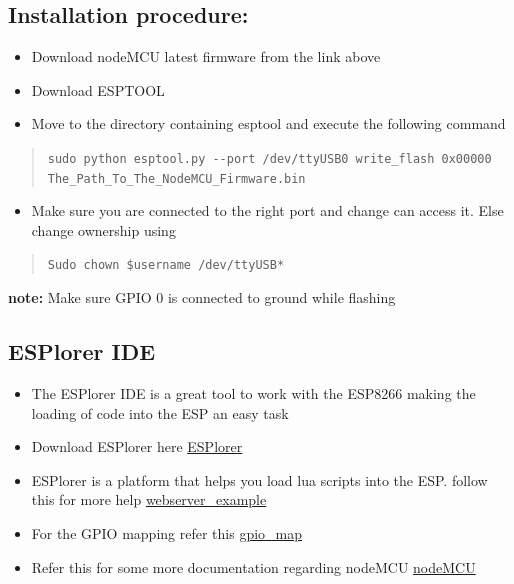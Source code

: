 \documentclass[16pt]{article}
\begin{document}
\subsection{Installation procedure:}

\begin{itemize}

\item
  Download nodeMCU latest firmware from the link above 
\item
  Download ESPTOOL
\item
  Move to the directory containing esptool and execute the following
  command
\end{itemize}

\begin{quote}
\texttt{sudo python esptool.py -{}-port /dev/ttyUSB0  write\_flash 0x00000 The\_Path\_To\_The\_NodeMCU\_Firmware.bin}
\end{quote}

\begin{itemize}

\item
  Make sure you are connected to the right port and change can access
  it. Else change ownership using
\end{itemize}

\begin{quote}
\texttt{Sudo chown \$username /dev/ttyUSB*}
\end{quote}

\textbf{note:} Make sure GPIO 0 is connected to ground while flashing
\vspace{0.5cm}

\subsection{ESPlorer IDE}

\begin{itemize}

\item
  The ESPlorer IDE is a great tool to work with the ESP8266 making the
  loading of code into the ESP an easy task
\item
  Download ESPlorer here
 {\color{red}\href{http://esp8266.ru/esplorer/\#download}{ESPlorer}}
\item
  ESPlorer is a platform that helps you load lua scripts into the ESP.
  follow this for more help
  {\color{red}\href{http://randomnerdtutorials.com/esp8266-web-server/}{webserver\_example}}
\item
  For the GPIO mapping refer this
  {\color{red}\href{https://github.com/nodemcu/nodemcu-firmware}{gpio\_map}}
\item
  Refer this for some more documentation regarding nodeMCU
  {\color{red}\href{http://www.nodemcu.com/docs/}{nodeMCU}}
\end{itemize}
\end{document}
